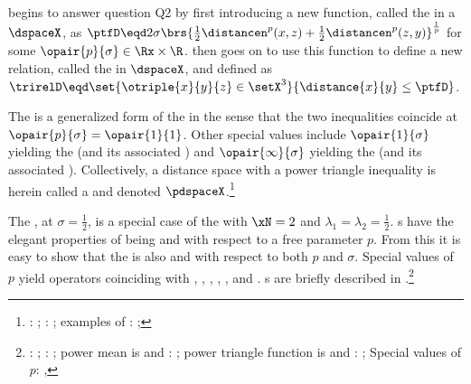  begins to answer question Q2 by first introducing a new function, 
called the 
in a  $\dspaceX$, as 
\quad$\ptfD\eqd 2\sigma\brs{\frac{1}{2}\distancen^p(x,z) + \frac{1}{2}\distancen^p(z,y)}^\frac{1}{p}$\quad
for some $\opair{p}{\sigma}\in\Rx\times\R$.
 then goes on to use this function to define a new relation, called the 
 in $\dspaceX$, and defined as 
\\\indentx$\trirelD\eqd\set{\otriple{x}{y}{z}\in\setX^3}{\distance{x}{y}\le\ptfD}$.

The  is a generalized form of the  in the sense that 
the two inequalities coincide at $\opair{p}{\sigma}=\opair{1}{1}$.
Other special values include $\opair{1}{\sigma}$ yielding the  
(and its associated )
and $\opair{\infty}{\sigma}$ yielding the  
(and its associated ).
Collectively, a distance space with a power triangle inequality is herein called a 
and denoted $\pdspaceX$.\footnote{
  : ;
  : ;
  examples of : ;
  }

The , at $\sigma=\frac{1}{2}$, is a special case of the  with $\xN=2$ 
and $\lambda_1=\lambda_2=\frac{1}{2}$.
s have the elegant properties of being  and  with respect
to a free parameter $p$.
From this it is easy to show that the  is also 
 and  with respect to both $p$ and $\sigma$.
Special values of $p$ yield operators coinciding with , , , ,
, and .
s are briefly described in .\footnote{
  : ;
  : ;
  power mean is  and : ;
  power triangle function is  and : ;
  Special values of $p$: , 
  }

